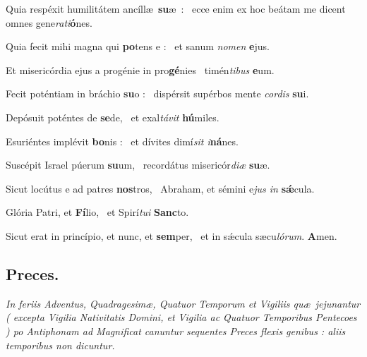 \documentclass[12pt]{article} %
\def\noinitial{%
\gresetfirstlineaboveinitial{\textcolor{benred8}{\small \textsc{\textbf{}}}}{\textcolor{benred8}{\small \textsc{\textbf{}}}}
\setspaceafterinitial{0pt plus 0em minus 0em}%
\setspacebeforeinitial{0pt plus 0em minus 0em}%
\relax %
}
\newenvironment{psalmtext}{\leftskip 0.25in}{\vspace{1 mm}}
\newenvironment{rubric}{\vspace{1 mm}\color{benred8} \itshape \leftskip 0in \setlength{\parindent}{0.25in}}{\vspace{1 mm}}
\let\oldgresixstar\gresixstar
\renewcommand{\gresixstar}{\textcolor{benred8}{\oldgresixstar}}
\begin{document}
\begin{psalmtext}
Quia resp\'{e}xit humilit\'{a}tem anc\'{i}ll\ae\ \textbf{su}\ae\ : \gresixstar\ ecce enim ex hoc be\'{a}tam me dicent omnes gene\emph{rati}\textbf{\'{o}}nes.

Quia fecit mihi magna qui \textbf{po}tens e : \gresixstar\ et sanum \emph{nomen} \textbf{e}jus.

Et miseric\'{o}rdia ejus a prog\'{e}nie in pro\textbf{g\'{e}}nies \gresixstar\ tim\'{e}n\emph{tibus} \textbf{e}um.

Fecit pot\'{e}ntiam in br\'{a}chio \textbf{su}o : \gresixstar\ disp\'{e}rsit sup\'{e}rbos mente \emph{cordis} \textbf{su}i.

Dep\'{o}suit pot\'{e}ntes de \textbf{se}de, \gresixstar\ et exal\emph{t\'{a}vit} \textbf{h\'{u}}miles.

Esuri\'{e}ntes impl\'{e}vit \textbf{bo}nis : \gresixstar\ et d\'{i}vites dim\'{i}\emph{sit i}\textbf{n\'{a}}nes.

Susc\'{e}pit Israel p\'{u}erum \textbf{su}um, \gresixstar\ record\'{a}tus miseric\'{o}r\emph{di\ae} \textbf{su}\ae.

Sicut loc\'{u}tus e ad patres \textbf{nos}tros, \gresixstar\ Abraham, et s\'{e}mini e\emph{jus in} \textbf{s\'{\ae}}cula.

Glória Patri, et \textbf{Fí}lio, \gresixstar\ et Spirí\emph{tui} \textbf{Sanc}to.

Sicut erat in princípio, et nunc, et \textbf{sem}per, \gresixstar\ et in sǽcula sæcu\emph{lórum}. \textbf{A}men.

\end{psalmtext}

{\noinitial
{}

}


\subsection*{}

\subsection*{Preces.}

\begin{rubric}
In feriis Adventus, Quadragesim\ae , Quatuor Temporum et Vigiliis qu\ae\ jejunantur ( excepta Vigilia Nativitatis Domini, et Vigilia ac Quatuor Temporibus Pentecoes ) po Antiphonam ad Magnificat canuntur sequentes Preces flexis genibus : aliis temporibus non dicuntur.

\end{rubric}
\end{document}
